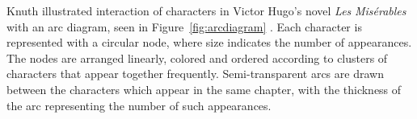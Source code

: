 \documentclass{article}
\begin{document}
Knuth illustrated interaction of characters in Victor Hugo's novel \textit{Les} \textit{Mis\'erables} with an arc diagram, seen in Figure~\ref{fig:arcdiagram} \cite{Knuth:1993:SGP:164984}.  Each character is represented with a circular node, where size indicates the number of appearances.  The nodes are arranged linearly, colored and ordered according to clusters of characters that appear together frequently.  Semi-transparent arcs are drawn between the characters which appear in the same chapter, with the thickness of the arc representing the number of such appearances.  %




\end{document}
